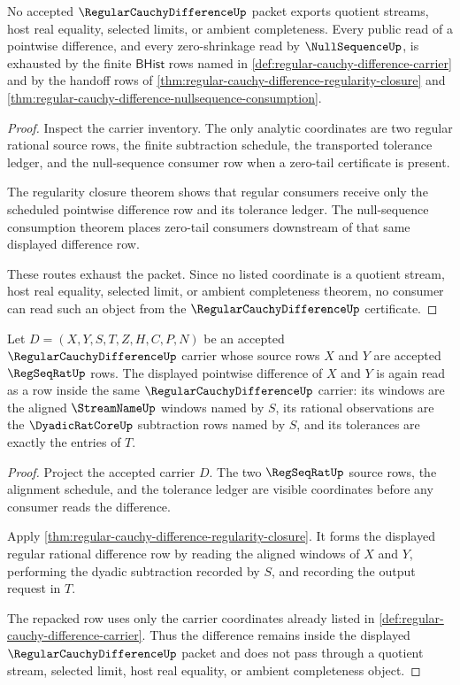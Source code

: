 \begin{theorem}
\label{thm:regular-cauchy-difference-non-escape-boundary}
No accepted $\RegularCauchyDifferenceUp$ packet exports quotient streams, host real equality, selected limits, or ambient completeness. Every public read of a pointwise difference, and every zero-shrinkage read by $\NullSequenceUp$, is exhausted by the finite $\mathsf{BHist}$ rows named in \autoref{def:regular-cauchy-difference-carrier} and by the handoff rows of \autoref{thm:regular-cauchy-difference-regularity-closure} and \autoref{thm:regular-cauchy-difference-nullsequence-consumption}.
\end{theorem}
\begin{proof}
Inspect the carrier inventory. The only analytic coordinates are two regular rational source rows, the finite subtraction schedule, the transported tolerance ledger, and the null-sequence consumer row when a zero-tail certificate is present.

The regularity closure theorem shows that regular consumers receive only the scheduled pointwise difference row and its tolerance ledger. The null-sequence consumption theorem places zero-tail consumers downstream of that same displayed difference row.

These routes exhaust the packet. Since no listed coordinate is a quotient stream, host real equality, selected limit, or ambient completeness theorem, no consumer can read such an object from the $\RegularCauchyDifferenceUp$ certificate.
\end{proof}

\begin{theorem}
\label{thm:regular-cauchy-difference-difference-carrier-closure}
Let $D=(X,Y,S,T,Z,H,C,P,N)$ be an accepted $\RegularCauchyDifferenceUp$ carrier whose source rows $X$ and $Y$ are accepted $\RegSeqRatUp$ rows. The displayed pointwise difference of $X$ and $Y$ is again read as a row inside the same $\RegularCauchyDifferenceUp$ carrier: its windows are the aligned $\StreamNameUp$ windows named by $S$, its rational observations are the $\DyadicRatCoreUp$ subtraction rows named by $S$, and its tolerances are exactly the entries of $T$.
\end{theorem}
\begin{proof}
Project the accepted carrier $D$. The two $\RegSeqRatUp$ source rows, the alignment schedule, and the tolerance ledger are visible coordinates before any consumer reads the difference.

Apply \autoref{thm:regular-cauchy-difference-regularity-closure}. It forms the displayed regular rational difference row by reading the aligned windows of $X$ and $Y$, performing the dyadic subtraction recorded by $S$, and recording the output request in $T$.

The repacked row uses only the carrier coordinates already listed in \autoref{def:regular-cauchy-difference-carrier}. Thus the difference remains inside the displayed $\RegularCauchyDifferenceUp$ packet and does not pass through a quotient stream, selected limit, host real equality, or ambient completeness object.
\end{proof}

